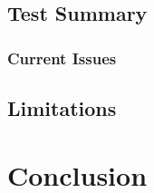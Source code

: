 \documentclass{UoYCSproject}
\begin{document}
\restoregeometry

\section{Test Summary} \label{test_summary}
\subsection{Current Issues}
\section{Limitations} \label{eval_limits}
\chapter{Conclusion}
\printbibliography
\end{document}

